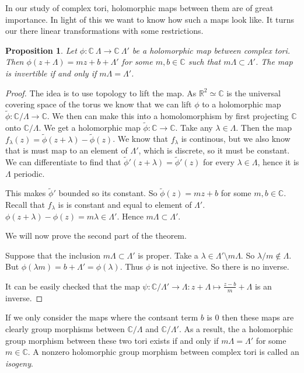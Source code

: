 \documentclass[a4paper]{article}
\theoremstyle{theoremdd}
\newtheorem{proposition}[theorem]{Proposition}
\theoremstyle{definitiondd}
\theoremstyle{remarkdd}
\newcommand{\C}{\mathbb{C}}
\newcommand{\R}{\mathbb{R}}
\newcommand{\ltr}{\par \noindent \framebox[1\width]{ $\implies$ } \hspace{.2cm}}
\newcommand{\rtl}{\par \noindent \framebox[1\width]{ $\impliedby$ } \hspace{.2cm} }
\begin{document}
In our study of complex tori, holomorphic maps between them are of great importance. 
In light of this we want to know how such a maps look like. It turns our there linear transformations with some restrictions. 
\begin{proposition}
	Let $\phi: \C \ \Lambda \to \C \ \Lambda'$ be a holomorphic map between complex tori. 
	Then $\phi(z + \Lambda) = mz + b + \Lambda'$ for some $m, b \in \C$ such that $m \Lambda \subset  \Lambda'$. 
	The map is invertible if and only if $m \Lambda = \Lambda'$.
\end{proposition}
\begin{proof}
	The idea is to use topology to lift the map. As $\R^2 \simeq \C$ is the universal covering space of the torus we know that we can lift $\phi$ to a holomorphic map $\tilde \phi: \C / \Lambda \to \C$. We then can make this into a homolomorphism by first projecting $\C$ onto $\C / \Lambda$. We get a holomorphic map  $\tilde \phi: \C \to \C$.
	Take any $\lambda \in \Lambda$. 
	Then the map $f_\lambda(z) = \tilde\phi(z + \lambda) - \tilde \phi(z)$. We know that $f_{\lambda}$ is continous, but we also know that is must map to an element of $\Lambda'$, which is discrete, so it must be constant. 
	We can differentiate to find that $\tilde\phi'(z+ \lambda) = \tilde\phi'(z)$ for every $\lambda \in \Lambda$, hence it is  $\Lambda$ periodic. 

	This makes $\tilde\phi'$ bounded so its constant. 
	So $\tilde \phi(z) = mz + b$ for some $m, b \in \C$. 
	Recall that $f_{\lambda}$ is is constant and equal to element of $\Lambda'$. 
	$\phi(z+\lambda) - \phi(z) = m\lambda \in \Lambda'$. 
	Hence $m \Lambda \subset \Lambda'$.

	We will now prove the second part of the theorem.
	\ltr Suppose that the inclusion  $m\Lambda \subset \Lambda'$ is proper. 
	Take a $\lambda \in \Lambda' \setminus m\Lambda$. 
	So $\lambda / m \not\in  \Lambda$. But $\phi(\lambda m) = b + \Lambda' = \phi(\lambda)$. Thus $\phi$ is not injective. So there is no inverse.
	\rtl It can be easily checked that the map $\psi: \C / \Lambda' \to \Lambda: z + \Lambda \mapsto  \frac{z-b}{m} + \Lambda$ is an inverse. 
\end{proof}
If we only consider the maps where the contsant term $b$ is $0$ then these maps are clearly group morphisms between $\C / \Lambda$ and  $\C / \Lambda'$. 
As a result, the a holomorphic group morphism between these two tori exists if and only if $m\Lambda = \Lambda'$ for some $m \in \C$. 
A nonzero holomorphic group morphism between complex tori is called an \emph{isogeny}.
\end{document}
